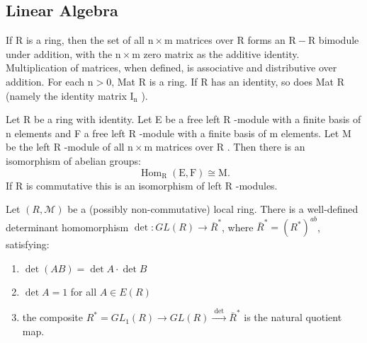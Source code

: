 \subsection*{Linear Algebra}

If R is a ring, then the set of all $\mathrm{n} \times \mathrm{m}$ matrices over R forms an $\mathrm{R}-\mathrm{R}$ bimodule under addition, with the $\mathrm{n} \times \mathrm{m}$ zero matrix as the additive identity. Multiplication of matrices, when defined, is associative and distributive over addition. For each $\mathrm{n}>0$, Mat R is a ring. If R has an identity, so does Mat R (namely the identity matrix $\mathrm{I}_{\mathrm{n}}$ ).

\begin{theo}
Let R be a ring with identity. Let E be a free left R -module with a finite basis of n elements and F a free left R -module with a finite basis of m elements. Let M be the left R -module of all $\mathrm{n} \times \mathrm{m}$ matrices over R . Then there is an isomorphism of abelian groups:
$$
\operatorname{Hom}_{\mathrm{R}}(\mathrm{E}, \mathrm{F}) \cong \mathrm{M} .
$$
If R is commutative this is an isomorphism of left R -modules.
\end{theo}

\begin{theo}
Let $(R, \mathcal{M})$ be a (possibly non-commutative) local ring. There is a well-defined determinant homomorphism $\det: GL(R) \rightarrow \overline{R}^*$, where $\bar{R}^*=\left(R^*\right)^{a b}$, satisfying:

\begin{enumerate}
    \item $\operatorname{det}(A B)=\operatorname{det} A \cdot \operatorname{det} B$
    \item $\operatorname{det} A=1$ for all $A \in E(R)$
    \item the composite $R^*=G L_1(R) \longrightarrow G L(R) \xrightarrow{\text { det }} \bar{R}^*$ is the natural quotient map.
\end{enumerate}

\end{theo}






